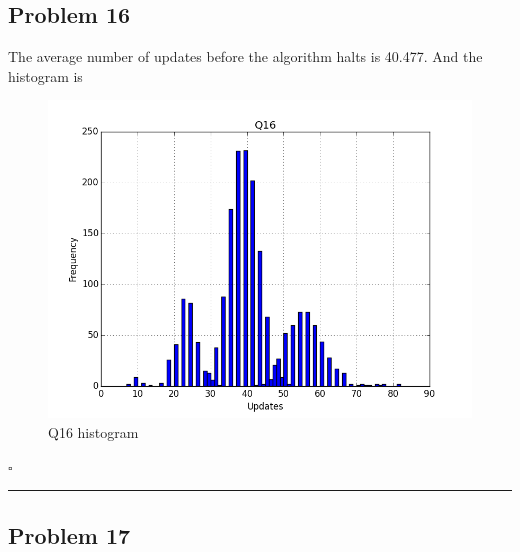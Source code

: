 \documentclass[12pt]{article}
\newcommand*{\QEDB}{\hfill\ensuremath{\square}}
\newcommand{\horrule}[1]{\rule{\linewidth}{#1}}
\begin{document}
\subsection*{Problem 16}

The average number of updates before the
algorithm halts is 40.477. And the histogram is
\begin{figure}[h]
\centering
\includegraphics[scale=0.3]{Q16}
\caption{Q16 histogram}
\label{Q16}
\end{figure}

\QEDB

\horrule{0.5pt}

\subsection*{Problem 17}
\end{document}
